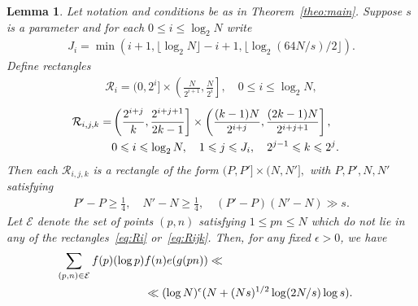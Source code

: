 \documentclass[12pt]{amsart}
\newtheorem{lemma}{Lemma}
\def\cE{{\mathcal E}}
\def\cR{{\mathcal R}}
\def\\{\cr}
\def\le{\leqslant}
\def\ge{\geqslant}
\begin{document}
\begin{lemma}
\label{lem:partition}
Let notation and conditions be as in Theorem~\ref{theo:main}. Suppose $s$ is a parameter and for each $0\le i \le \log_2{N}$ write
\begin{align}
\label{eq:Jidef}
J_i=\min\left(i+1,\lfloor \log_2{N}\rfloor-i+1,\lfloor \log_2(64N/s)/2\rfloor \right).
\end{align}
Define rectangles 
\begin{align}
\label{eq:Ri}
\cR_i=(0,2^{i}]\times \left(\frac{N}{2^{i+1}},\frac{N}{2^{i}}\right], \quad 0\le i \le \log_2{N},
\end{align}
\begin{align}
\label{eq:Rijk}
\begin{split}
\cR_{i,j,k}=&\left(\frac{2^{i+j}}{k},\frac{2^{i+j+1}}{2k-1}\right]\times \left(\frac{(k-1)N}{2^{i+j}},\frac{(2k-1)N}{2^{i+j+1}} \right], \\
 &0\le i \le \log_2{N}, \quad 1\le j \le J_i, \quad 2^{j-1}\le k \le 2^{j}.
\end{split}
\end{align}
Then each $\cR_{i,j,k}$ is a rectangle of the form $(P,P']\times (N,N'],$ with $P,P',N,N'$ satisfying 
\begin{align*}
P'-P\ge \frac{1}{4}, \quad N'-N\ge \frac{1}{4}, \quad (P'-P)(N'-N)\gg s.
\end{align*}
Let $\cE$ denote the set of points  $(p,n)$ satisfying $1\le pn\le N$ which do not lie in any of the rectangles~\eqref{eq:Ri} or~\eqref{eq:Rijk}. Then, for any fixed $\epsilon >0$, we have 
\begin{align*}
\sum_{(p,n)\in \cE} f(p)(\log{p})&f(n)e(g(pn)) \ll \\ &\ll  (\log N)^{\epsilon}(N+(Ns)^{1/2}\log({2N/s})\log{s}).
\end{align*}

\end{lemma}
\end{document}
